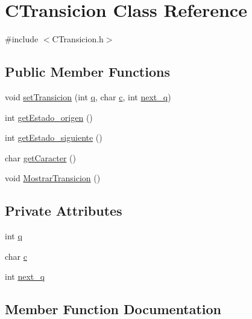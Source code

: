 \hypertarget{classCTransicion}{}\section{C\+Transicion Class Reference}
\label{classCTransicion}


{\ttfamily \#include $<$C\+Transicion.\+h$>$}

\subsection*{Public Member Functions}
\begin{DoxyCompactItemize}
\item 
void \hyperlink{classCTransicion_a3bd402b9a500069fa3d7a8c6a622e859}{set\+Transicion} (int \hyperlink{classCTransicion_a6add557ec0b0aaaa974346f4f9dd1585}{q}, char \hyperlink{classCTransicion_a25058569b7c254796fa648be9bfe2222}{c}, int \hyperlink{classCTransicion_a9b95c9349367059e02de2e997ec3b2bb}{next\+\_\+q})
\item 
int \hyperlink{classCTransicion_aa1e8c8f2d8c1f9d5ffd3cd34480a0d4a}{get\+Estado\+\_\+origen} ()
\item 
int \hyperlink{classCTransicion_ab54e183e404c57679ef661bae3d8ce57}{get\+Estado\+\_\+siguiente} ()
\item 
char \hyperlink{classCTransicion_a37623a49e327367d5bab7d01c6dd7827}{get\+Caracter} ()
\item 
void \hyperlink{classCTransicion_acfeb5ccd4314048acd29fd1804f66d22}{Mostrar\+Transicion} ()
\end{DoxyCompactItemize}
\subsection*{Private Attributes}
\begin{DoxyCompactItemize}
\item 
int \hyperlink{classCTransicion_a6add557ec0b0aaaa974346f4f9dd1585}{q}
\item 
char \hyperlink{classCTransicion_a25058569b7c254796fa648be9bfe2222}{c}
\item 
int \hyperlink{classCTransicion_a9b95c9349367059e02de2e997ec3b2bb}{next\+\_\+q}
\end{DoxyCompactItemize}


\subsection{Member Function Documentation}

